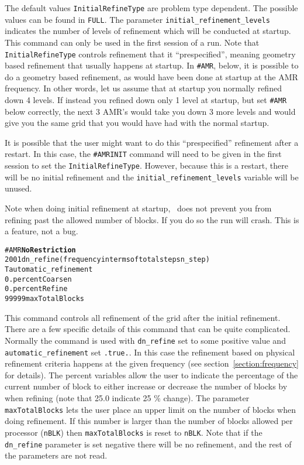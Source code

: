 The default values {\tt InitialRefineType} are problem type dependent.
The possible values can be found in {\tt FULL}.  The parameter
{\tt initial\_refinement\_levels} indicates the number of levels of 
refinement which will be conducted at startup.  This command can only
be used in the first session of a run.
Note that {\tt InitialRefineType}
controls refinement that it ``prespecified'',
meaning geometry based refinement that usually happens at startup.
In {\tt \#AMR}, below, it is possible to do a geometry based refinement,
as would have been done at startup at the AMR frequency.  In other
words, let us assume that at startup you normally refined down 4 levels.
If instead you refined down only 1 level at startup, but set {\tt \#AMR} below
correctly, the next 3 AMR's would take you down 3 more levels and would
give you the same grid that you would have had with the normal startup.

It is possible that the user might want to do this ``prespecified'' refinement
after a restart.  In this case, the {\tt \#AMRINIT} command will 
need to be given in the first session to set the {\tt InitialRefineType}.
However, because this is a restart, there will be no initial refinement and
the {\tt initial\_refinement\_levels} variable will be unused.

Note when doing initial refinement at startup, \BATSRUS\ does not prevent
you from refining past the allowed number of blocks.  If you do so the run
will crash.  This is a feature, not a bug.
\ \ \\

\begin{alltt}
#AMR \hfill {\bf No Restriction}
2001                   dn_refine (frequency in terms of total steps n_step)
T                      automatic_refinement 
0.                     percentCoarsen
0.                     percentRefine
99999                  maxTotalBlocks
\end{alltt}

This command controls all refinement of the grid after the initial refinement.
There are a few specific details of this command that can be quite complicated.
Normally the command is used with {\tt dn\_refine} set to some positive
value and {\tt automatic\_refinement} set {\tt .true.}.  In this case the 
refinement based on physical refinement criteria happens at the given 
frequency (see section~\ref{section:frequency} for details).  The
percent variables allow the user to
indicate the percentage of the current number of block to either increase
or decrease the number of blocks by when refining (note that 25.0
indicate 25 \% change).  The parameter {\tt maxTotalBlocks}
lets the user place an upper limit on the number of blocks when doing refinement.
If this number is larger than the number of blocks allowed per processor ({\tt nBLK})
then {\tt maxTotalBlocks} is reset to {\tt nBLK}.  Note that if the {\tt dn\_refine}
parameter is set negative there will be no refinement, and the rest of the parameters
are not read.

